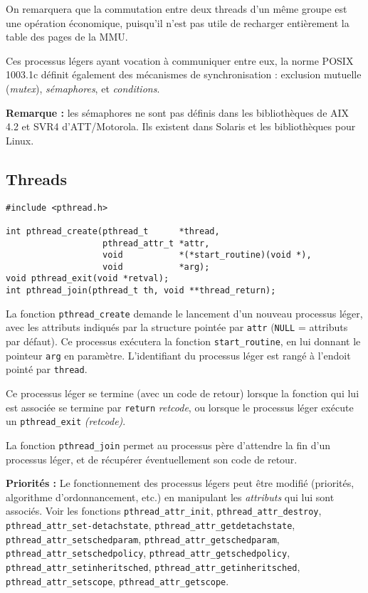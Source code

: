 On remarquera que la commutation entre deux threads d'un même groupe est
une opération économique, puisqu'il n'est pas utile de recharger 
entièrement la table des pages de la MMU.


Ces processus légers ayant vocation à communiquer entre eux, la norme
POSIX 1003.1c définit également des mécanismes de synchronisation :
exclusion mutuelle (\emph{mutex}), \emph{sémaphores}, et \emph{conditions}.

\textbf{Remarque :} les sémaphores ne sont pas définis dans les
bibliothèques de AIX 4.2 et SVR4 d'ATT/Motorola. Ils existent dans
Solaris et les bibliothèques pour Linux.


\subsection{Threads}

\extrait
\begin{lstlisting}
#include <pthread.h>

int pthread_create(pthread_t      *thread, 
                   pthread_attr_t *attr, 
                   void           *(*start_routine)(void *), 
                   void           *arg);
void pthread_exit(void *retval);
int pthread_join(pthread_t th, void **thread_return);
\end{lstlisting}


La fonction \texttt{pthread\_create} demande le lancement d'un nouveau
processus léger, avec les attributs indiqués par la structure
pointée par \texttt{attr} (\texttt{NULL} = attributs par défaut).
Ce processus exécutera la fonction \texttt{start\_routine}, en lui donnant le
pointeur \texttt{arg} en paramètre.  L'identifiant du processus léger est
rangé à l'endoit pointé par \texttt{thread}.


Ce processus léger se termine (avec un code de retour) 
lorsque la fonction qui lui est
associée se termine par \texttt{return} \emph{retcode}, ou lorsque 
le processus léger exécute un
\texttt{pthread\_exit} \emph{(retcode)}.


La fonction \texttt{pthread\_join} permet au processus père d'attendre 
la fin d'un processus léger, et de récupérer éventuellement
son code de retour.



\textbf{Priorités :} Le fonctionnement des processus légers peut être
modifié (priorités, algorithme d'ordonnancement, etc.) en manipulant
les \emph{attributs} qui lui sont associés. Voir les fonctions
\texttt{pthread\_attr\_init}, \texttt{pthread\_attr\_destroy},
\texttt{pthread\_attr\_set-detachstate},
\texttt{pthread\_attr\_getdetachstate},
\texttt{pthread\_attr\_setschedparam},
\texttt{pthread\_attr\_getschedparam},
\texttt{pthread\_attr\_setschedpolicy},
\texttt{pthread\_attr\_getschedpolicy},
\texttt{pthread\_attr\_setinheritsched},
\texttt{pthread\_attr\_getinheritsched}, \texttt{pthread\_attr\_setscope},
\texttt{pthread\_attr\_getscope}.

